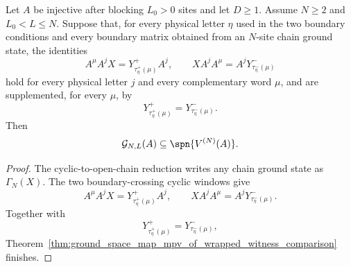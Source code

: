 \begin{theorem}
    \label{thm:conditional_normal_range_reduction_witness_comparison}
    \leanok
    Let $A$ be injective after blocking $L_0>0$ sites and let $D \ge 1$. Assume
    $N \ge 2$ and $L_0 < L \le N$. Suppose that, for every physical letter
    $\eta$ used in the two boundary conditions and every boundary matrix
    obtained from an $N$-site chain ground state, the identities
    \[
        A^\mu A^j X = Y^+_{\tau^+_\eta(\mu)}A^j,
        \qquad
        X A^j A^\mu = A^jY^-_{\tau^-_\eta(\mu)}
    \]
    hold for every physical letter $j$ and every complementary word $\mu$, and
    are supplemented, for every $\mu$, by
    \[
        Y^+_{\tau^+_\eta(\mu)}
        =
        Y^-_{\tau^-_\eta(\mu)}.
    \]
    Then
    \[
        \mathcal G_{N,L}(A)\subseteq \spn\{V^{(N)}(A)\}.
    \]
\end{theorem}

\begin{proof}
    \leanok
    The cyclic-to-open-chain reduction writes any chain ground state as
    $\Gamma_N(X)$. The two boundary-crossing cyclic windows give
    \[
        A^\mu A^jX=Y^+_{\tau^+_\eta(\mu)}A^j,
        \qquad
        XA^jA^\mu=A^jY^-_{\tau^-_\eta(\mu)}.
    \]
    Together with
    \[
        Y^+_{\tau^+_\eta(\mu)}
        =
        Y^-_{\tau^-_\eta(\mu)},
    \]
    Theorem~\ref{thm:ground_space_map_mpv_of_wrapped_witness_comparison}
    finishes.
\end{proof}

